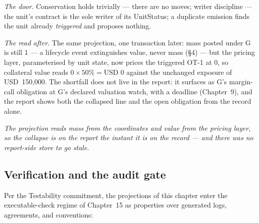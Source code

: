 \documentclass[11pt,a4paper]{article}
\newcommand{\USD}[1]{\mbox{USD~#1}}
\begin{document}
\emph{The door.} Conservation holds trivially --- there are no moves; writer
discipline --- the unit's contract is the sole writer of its UnitStatus; a
duplicate emission finds the unit already \emph{triggered} and proposes
nothing.

\emph{The read after.} The same projection, one transaction later: mass posted
under G is still 1 --- a lifecycle event extinguishes value, never mass
(\S 4) --- but the pricing layer, parameterised by unit state, now prices the
triggered OT-1 at 0, so collateral value reads $0 \times 50\% = \USD{0}$
against the unchanged exposure of \USD{150{,}000}. The shortfall does not live
in the report: it surfaces as G's margin-call obligation at G's declared
valuation watch, with a deadline (Chapter~9), and the report shows both the
collapsed line and the open obligation from the record alone.

\emph{The projection reads mass from the coordinates and value from the pricing
layer, so the collapse is on the report the instant it is on the record --- and
there was no report-side store to go stale.}

\subsection{Verification and the audit gate}

Per the Testability commitment, the projections of this chapter enter the
executable-check regime of Chapter~15 as properties over generated logs,
agreements, and conventions:
\end{document}

